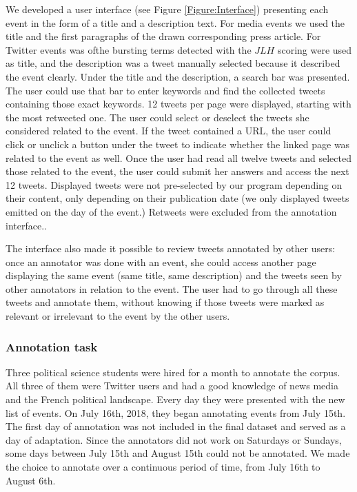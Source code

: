 We developed a user interface (see Figure \ref{Figure:Interface}) presenting each event in the form of a title and a description text. For media events we used the title and the first paragraphs of the drawn corresponding press article. For Twitter events  was ofthe bursting terms detected with the $JLH$ scoring were used as title, and the description was a tweet manually selected because it described the event clearly. Under the title and the description, a search bar was presented. The user could use that bar to enter keywords and find the collected tweets containing those exact keywords. 12 tweets per page were displayed, starting with the most retweeted one. The user could select or deselect the tweets she considered related to the event. If the tweet contained a URL, the user could click or unclick a button under the tweet to indicate whether the linked page was related to the event as well. Once the user had read all twelve tweets and selected those related to the event, the user could submit her answers and access the next 12 tweets. Displayed tweets were not pre-selected by our program depending on their content, only depending on their publication date (we only displayed tweets emitted on the day of the event.) Retweets were excluded from the annotation interface..  


The interface also made it possible to review tweets annotated by other users: once an annotator was done with an event, she could access another page displaying the same event (same title, same description) and the tweets seen by other annotators in relation to the event. The user had to go through all these tweets and annotate them, without knowing if those tweets were marked as relevant or irrelevant to the event by the other users.

		\subsubsection{Annotation task}
	Three political science students were hired for a month to annotate the corpus. All three of them were Twitter users and had a good knowledge of news media and the French political landscape. Every day they were presented with the new list of events. On July 16th, 2018, they began annotating events from July 15th. The first day of annotation was not included in the final dataset and served as a day of adaptation. Since the annotators did not work on Saturdays or Sundays, some days between July 15th and August 15th could not be annotated. We made the choice to annotate over a continuous period of time, from July 16th to August 6th.


